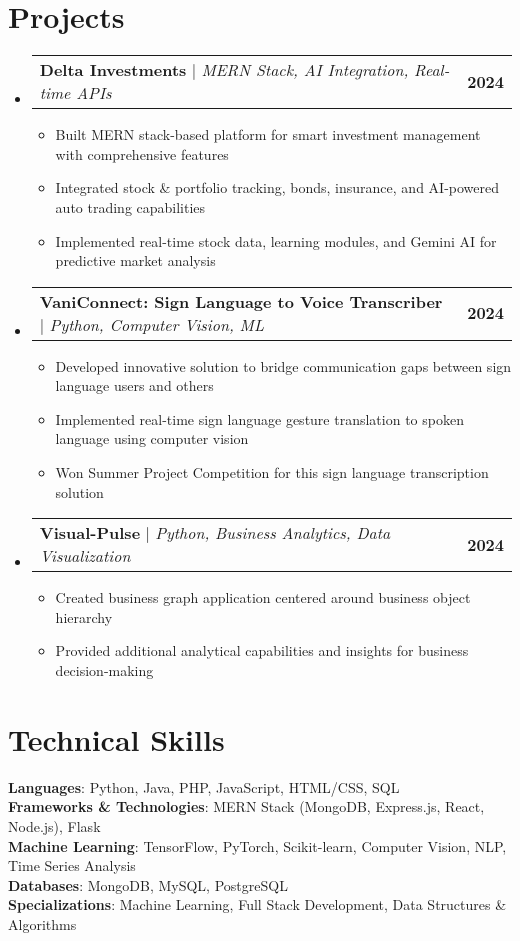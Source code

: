 \documentclass[letterpaper,11pt]{article}
\makeatletter
\newcommand{\resumeItem}[1]{
  \item\small{
    {#1 \vspace{-2pt}}
  }
}
\newcommand{\resumeProjectHeading}[2]{
    \item
    \begin{tabular*}{1.001\textwidth}{l@{\extracolsep{\fill}}r}
      \small#1 & \textbf{\small #2}\\
    \end{tabular*}\vspace{-7pt}
}
\newcommand{\resumeSubHeadingListStart}{\begin{itemize}[leftmargin=0.0in, label={}]}
\newcommand{\resumeSubHeadingListEnd}{\end{itemize}}
\newcommand{\resumeItemListStart}{\begin{itemize}}
\newcommand{\resumeItemListEnd}{\end{itemize}\vspace{-5pt}}
\makeatother
\begin{document}
\section{Projects}
    \vspace{-5pt}
    \resumeSubHeadingListStart
      \resumeProjectHeading
          {\textbf{Delta Investments} $|$ \emph{MERN Stack, AI Integration, Real-time APIs}}{2024}
          \resumeItemListStart
            \resumeItem{Built MERN stack-based platform for smart investment management with comprehensive features}
            \resumeItem{Integrated stock \& portfolio tracking, bonds, insurance, and AI-powered auto trading capabilities}
            \resumeItem{Implemented real-time stock data, learning modules, and Gemini AI for predictive market analysis}
          \resumeItemListEnd
          \vspace{-13pt}
      \resumeProjectHeading
          {\textbf{VaniConnect: Sign Language to Voice Transcriber} $|$ \emph{Python, Computer Vision, ML}}{2024}
          \resumeItemListStart
            \resumeItem{Developed innovative solution to bridge communication gaps between sign language users and others}
            \resumeItem{Implemented real-time sign language gesture translation to spoken language using computer vision}
            \resumeItem{Won Summer Project Competition for this sign language transcription solution}
          \resumeItemListEnd 
          \vspace{-13pt}
      \resumeProjectHeading
          {\textbf{Visual-Pulse} $|$ \emph{Python, Business Analytics, Data Visualization}}{2024}
          \resumeItemListStart
            \resumeItem{Created business graph application centered around business object hierarchy}
            \resumeItem{Provided additional analytical capabilities and insights for business decision-making}
          \resumeItemListEnd
    \resumeSubHeadingListEnd
\vspace{-15pt}

\section{Technical Skills}
 \begin{itemize}[leftmargin=0.15in, label={}]
    \small{\item{
     \textbf{Languages}{: Python, Java, PHP, JavaScript, HTML/CSS, SQL} \\
     \textbf{Frameworks \& Technologies}{: MERN Stack (MongoDB, Express.js, React, Node.js), Flask} \\
     \textbf{Machine Learning}{: TensorFlow, PyTorch, Scikit-learn, Computer Vision, NLP, Time Series Analysis} \\
     \textbf{Databases}{: MongoDB, MySQL, PostgreSQL} \\
     \textbf{Specializations}{: Machine Learning, Full Stack Development, Data Structures \& Algorithms}
    }}
 \end{itemize}
 \vspace{-16pt}
\end{document}

